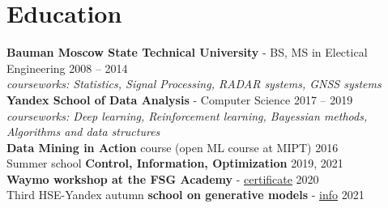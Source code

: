 \section*{\sectionformat Education}
\textbf{Bauman Moscow State Technical University} - BS, MS in Electical Engineering \hfill 2008 -- 2014 \\
\textit{courseworks: Statistics, Signal Processing, RADAR systems, GNSS systems} \\
% 
\textbf{Yandex School of Data Analysis} - Computer Science \hfill 2017 -- 2019 \\
\textit{courseworks: Deep learning, Reinforcement learning, Bayessian methods, Algorithms and data structures} \\
% 
\textbf{Data Mining in Action} course (open ML course at MIPT) \hfill    2016         \\
% 
Summer school \textbf{Control, Information, Optimization}                                                                                             \hfill  2019, 2021 \\
%
\textbf{Waymo workshop at the FSG Academy} - \href{https://drive.google.com/file/d/1-WxECccxBrRWIvEt9WQeXKTueiF658r7/view?usp=sharing}{certificate}   \hfill  2020       \\
% 
Third HSE-Yandex autumn \textbf{school on generative models} - \href{https://indico.cern.ch/event/1082512/timetable/#20211123}{info}                  \hfill  2021
\nolinebreak